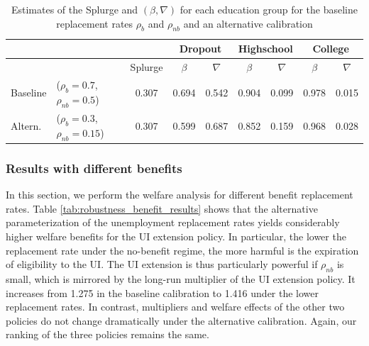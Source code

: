 \documentclass[\econtexRoot/EGMN]{subfiles}
\begin{document}
\begin{table}[t]
    \begin{center}
        \begin{tabular}{llc|cccccc}
            \toprule
                     &                                     &         & \multicolumn{2}{c}{Dropout} & \multicolumn{2}{c}{Highschool} & \multicolumn{2}{c}{College}                                 \\ \midrule
                     &                                     & Splurge & $\beta$                     & $\nabla$                       & $\beta$                     & $\nabla$ & $\beta$ & $\nabla$ \\ \midrule
            Baseline & ($\rho_{b}=0.7$, $\rho_{nb}=0.5$)   & 0.307   & 0.694                       & 0.542                          & 0.904                       & 0.099    & 0.978   & 0.015    \\
            Altern.  & ($\rho_{b}=0.3$,  $\rho_{nb}=0.15$) & 0.307   & 0.599                       & 0.687                          & 0.852                       & 0.159    & 0.968   & 0.028
            \\ \bottomrule
        \end{tabular}
    \end{center}
    \caption{Estimates of the Splurge and $(\beta,\nabla)$ for each education group for the baseline replacement rates $\rho_{b}$ and $\rho_{nb}$ and an alternative calibration}
    \notinsubfile{\label{tab:robustness_benefits}}
\end{table}


\FloatBarrier
\subsubsection{Results with different benefits}
\notinsubfile{\label{sec:robust_benefits_results}}

In this section, we perform the welfare analysis for different benefit replacement rates. Table \ref{tab:robustness_benefit_results} shows that the alternative parameterization of the unemployment replacement rates yields considerably higher welfare benefits for the UI extension policy. In particular, the lower the replacement rate under the no-benefit regime, the more harmful is the expiration of eligibility to the UI. The UI extension is thus particularly powerful if $\rho_{nb}$ is small, which is mirrored by the long-run multiplier of the UI extension policy. It increases from 1.275 in the baseline calibration to 1.416 under the lower replacement rates. In contrast, multipliers and welfare effects of the other two policies do not change dramatically under the alternative calibration. Again, our ranking of the three policies remains the same.
\end{document}
